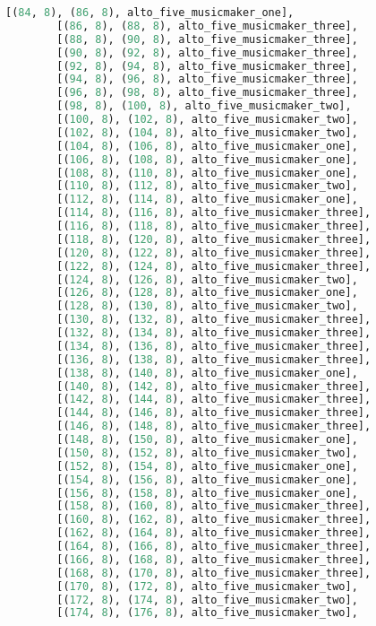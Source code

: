 \begin{lstlisting}[language=Python, caption=Invocation Source Code]
        [(84, 8), (86, 8), alto_five_musicmaker_one],
        [(86, 8), (88, 8), alto_five_musicmaker_three],
        [(88, 8), (90, 8), alto_five_musicmaker_three],
        [(90, 8), (92, 8), alto_five_musicmaker_three],
        [(92, 8), (94, 8), alto_five_musicmaker_three],
        [(94, 8), (96, 8), alto_five_musicmaker_three],
        [(96, 8), (98, 8), alto_five_musicmaker_three],
        [(98, 8), (100, 8), alto_five_musicmaker_two],
        [(100, 8), (102, 8), alto_five_musicmaker_two],
        [(102, 8), (104, 8), alto_five_musicmaker_two],
        [(104, 8), (106, 8), alto_five_musicmaker_one],
        [(106, 8), (108, 8), alto_five_musicmaker_one],
        [(108, 8), (110, 8), alto_five_musicmaker_one],
        [(110, 8), (112, 8), alto_five_musicmaker_two],
        [(112, 8), (114, 8), alto_five_musicmaker_one],
        [(114, 8), (116, 8), alto_five_musicmaker_three],
        [(116, 8), (118, 8), alto_five_musicmaker_three],
        [(118, 8), (120, 8), alto_five_musicmaker_three],
        [(120, 8), (122, 8), alto_five_musicmaker_three],
        [(122, 8), (124, 8), alto_five_musicmaker_three],
        [(124, 8), (126, 8), alto_five_musicmaker_two],
        [(126, 8), (128, 8), alto_five_musicmaker_one],
        [(128, 8), (130, 8), alto_five_musicmaker_two],
        [(130, 8), (132, 8), alto_five_musicmaker_three],
        [(132, 8), (134, 8), alto_five_musicmaker_three],
        [(134, 8), (136, 8), alto_five_musicmaker_three],
        [(136, 8), (138, 8), alto_five_musicmaker_three],
        [(138, 8), (140, 8), alto_five_musicmaker_one],
        [(140, 8), (142, 8), alto_five_musicmaker_three],
        [(142, 8), (144, 8), alto_five_musicmaker_three],
        [(144, 8), (146, 8), alto_five_musicmaker_three],
        [(146, 8), (148, 8), alto_five_musicmaker_three],
        [(148, 8), (150, 8), alto_five_musicmaker_one],
        [(150, 8), (152, 8), alto_five_musicmaker_two],
        [(152, 8), (154, 8), alto_five_musicmaker_one],
        [(154, 8), (156, 8), alto_five_musicmaker_one],
        [(156, 8), (158, 8), alto_five_musicmaker_one],
        [(158, 8), (160, 8), alto_five_musicmaker_three],
        [(160, 8), (162, 8), alto_five_musicmaker_three],
        [(162, 8), (164, 8), alto_five_musicmaker_three],
        [(164, 8), (166, 8), alto_five_musicmaker_three],
        [(166, 8), (168, 8), alto_five_musicmaker_three],
        [(168, 8), (170, 8), alto_five_musicmaker_three],
        [(170, 8), (172, 8), alto_five_musicmaker_two],
        [(172, 8), (174, 8), alto_five_musicmaker_two],
        [(174, 8), (176, 8), alto_five_musicmaker_two],

\end{lstlisting}
